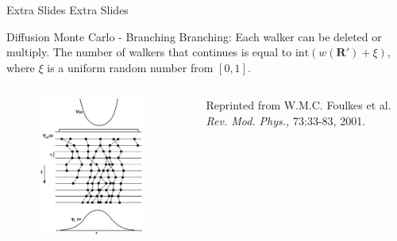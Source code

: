 \documentclass{beamer}
\newcommand{\R}{\mathbf{R}}
\begin{document}

\begin{frame}{Extra Slides}
Extra Slides
\end{frame}

\begin{frame}{Diffusion Monte Carlo - Branching}
Branching: Each walker can be deleted or multiply. The number of walkers that continues is equal to $\mathrm{int}\left(w(\R')+\xi\right)$, where $\xi$ is a uniform random number from $[0,1]$.
\begin{columns}
\begin{column}{0.4\textwidth}
\begin{figure}
   \includegraphics[width=0.9\textwidth]{branch_full.png}
\end{figure}
\end{column}
\begin{column}{0.7\textwidth}
   {\color{blue}{Figure:}} Reprinted from W.M.C. Foulkes et al. \textit{Rev. Mod. Phys.,} 73:33-83, 2001.
\end{column}
\end{columns}
\end{frame}
\end{document}
